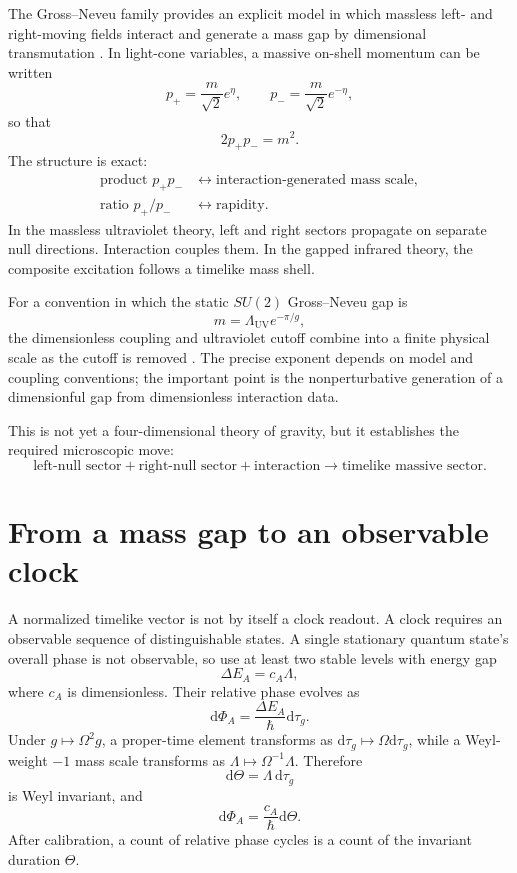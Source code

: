 \documentclass[11pt,a4paper]{article}
\newcommand{\dd}{\mathrm{d}}
\newcommand{\ThetaClock}{\Theta}
\newcommand{\UV}{\mathrm{UV}}
\begin{document}
The Gross--Neveu family provides an explicit model in which massless left- and right-moving fields interact and generate a mass gap by dimensional transmutation \cite{GrossNeveu1974,Pasnoori2026}. In light-cone variables, a massive on-shell momentum can be written
\begin{equation}
p_+=\frac{m}{\sqrt2}e^\eta,
\qquad
p_-=\frac{m}{\sqrt2}e^{-\eta},
\label{eq:lightconemass}
\end{equation}
so that
\begin{equation}
2p_+p_-=m^2.
\end{equation}
The structure is exact:
\begin{align}
\text{product }p_+p_-&\longleftrightarrow\text{interaction-generated mass scale},\\
\text{ratio }p_+/p_-&\longleftrightarrow\text{rapidity}.
\end{align}
In the massless ultraviolet theory, left and right sectors propagate on separate null directions. Interaction couples them. In the gapped infrared theory, the composite excitation follows a timelike mass shell.

For a convention in which the static $SU(2)$ Gross--Neveu gap is
\[
m=\Lambda_{\UV}e^{-\pi/g},
\]
the dimensionless coupling and ultraviolet cutoff combine into a finite physical scale as the cutoff is removed \cite{Pasnoori2026}. The precise exponent depends on model and coupling conventions; the important point is the nonperturbative generation of a dimensionful gap from dimensionless interaction data.

This is not yet a four-dimensional theory of gravity, but it establishes the required microscopic move:
\[
\boxed{
\text{left-null sector}+\text{right-null sector}+\text{interaction}
\longrightarrow
\text{timelike massive sector}.
}
\]

\section{From a mass gap to an observable clock}

A normalized timelike vector is not by itself a clock readout. A clock requires an observable sequence of distinguishable states. A single stationary quantum state's overall phase is not observable, so use at least two stable levels with energy gap
\[
\Delta E_A=c_A\Lambda,
\]
where $c_A$ is dimensionless. Their relative phase evolves as
\begin{equation}
\dd\Phi_A=\frac{\Delta E_A}{\hbar}\dd\tau_g.
\label{eq:phaseevolution}
\end{equation}
Under $g\mapsto\Omega^2g$, a proper-time element transforms as $\dd\tau_g\mapsto\Omega\dd\tau_g$, while a Weyl-weight $-1$ mass scale transforms as $\Lambda\mapsto\Omega^{-1}\Lambda$. Therefore
\begin{equation}
\boxed{\dd\ThetaClock=\Lambda\,\dd\tau_g}
\label{eq:clockoneformscalar}
\end{equation}
is Weyl invariant, and
\[
\dd\Phi_A=\frac{c_A}{\hbar}\dd\ThetaClock.
\]
After calibration, a count of relative phase cycles is a count of the invariant duration $\ThetaClock$.
\end{document}

